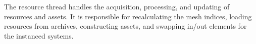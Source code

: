 The resource thread handles the acquisition, processing, and updating of resources and assets. It is responsible for recalculating the mesh indices, loading resources from archives, constructing assets, and swapping in/out elements for the instanced systems.